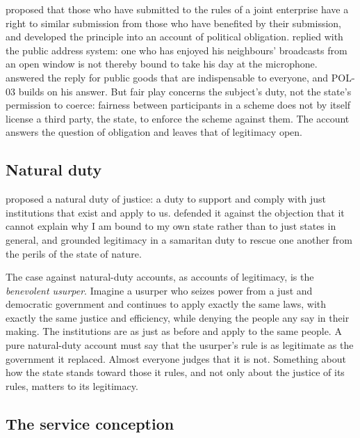 \documentclass{situationist-preprint}
\begin{document}
\citet{Hart1955} proposed that those who have submitted to the rules of a joint enterprise have a right to similar submission from those who have benefited by their submission, and \citet{Rawls1964} developed the principle into an account of political obligation. \citet[ch.~5]{Nozick1974} replied with the public address system: one who has enjoyed his neighbours' broadcasts from an open window is not thereby bound to take his day at the microphone. \citet{Klosko1992} answered the reply for public goods that are indispensable to everyone, and POL-03 builds on his answer. But fair play concerns the subject's duty, not the state's permission to coerce: fairness between participants in a scheme does not by itself license a third party, the state, to enforce the scheme against them. The account answers the question of obligation and leaves that of legitimacy open.

\subsection{Natural duty}

\citet[\S 19]{Rawls1971} proposed a natural duty of justice: a duty to support and comply with just institutions that exist and apply to us. \citet{Waldron1993} defended it against the objection that it cannot explain why I am bound to my own state rather than to just states in general, and \citet{Wellman1996} grounded legitimacy in a samaritan duty to rescue one another from the perils of the state of nature.

The case against natural-duty accounts, as accounts of legitimacy, is the \emph{benevolent usurper}. Imagine a usurper who seizes power from a just and democratic government and continues to apply exactly the same laws, with exactly the same justice and efficiency, while denying the people any say in their making. The institutions are as just as before and apply to the same people. A pure natural-duty account must say that the usurper's rule is as legitimate as the government it replaced. Almost everyone judges that it is not. Something about how the state stands toward those it rules, and not only about the justice of its rules, matters to its legitimacy.

\subsection{The service conception}
\end{document}
